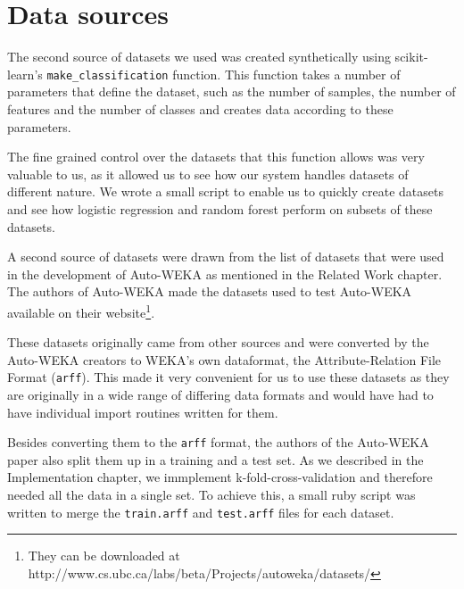 \documentclass[a4paper,12pt,twoside,openright]{report}
\begin{document}


 

\section{Data sources}
The second source of datasets we used was created synthetically using scikit-learn's \texttt{make\_classification} function. This function takes a number of parameters that define the dataset, such as the number of samples, the number of features and the number of classes and creates data according to these parameters. 

The fine grained control over the datasets that this function allows was very valuable to us, as it allowed us to see how our system handles datasets of different nature. We wrote a small script to enable us to quickly create datasets and see how logistic regression and random forest perform on subsets of these datasets.

A second source of datasets were drawn from the list of datasets that were used in the development of Auto-WEKA as mentioned in the Related Work chapter. The authors of Auto-WEKA made the datasets used to test Auto-WEKA available on their website\footnote{They can be downloaded at http://www.cs.ubc.ca/labs/beta/Projects/autoweka/datasets/}.

These datasets originally came from other sources \cite{Lichman:2013, Larochelle:2007:EED:1273496.1273556, Krizhevsky09learningmultiple} and were converted by the Auto-WEKA creators to WEKA's own dataformat, the Attribute-Relation File Format (\texttt{arff}). This made it very convenient for us to use these datasets as they are originally in a wide range of differing data formats and would have had to have individual import routines written for them. 

Besides converting them to the \texttt{arff} format, the authors of the Auto-WEKA paper also split them up in a training and a test set. As we described in the Implementation chapter, we immplement k-fold-cross-validation and therefore needed all the data in a single set. To achieve this, a small ruby script was written to merge the \texttt{train.arff} and \texttt{test.arff} files for each dataset.
\end{document}
